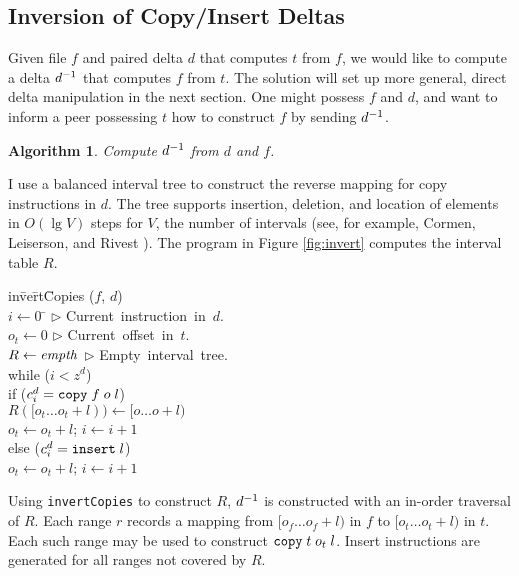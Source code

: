\documentclass{llncs}
\newtheorem{alg}{{\sc Algorithm}}
\begin{document}
\subsection{Inversion of Copy/Insert Deltas} \label{sec:invert}

Given file $f$ and paired delta $d$ that computes $t$ from $f$, we
would like to compute a delta $d^{-1}$ that computes $f$ from $t$.
The solution will set up more general, direct delta manipulation in
the next section.  One might possess $f$ and $d$, and want to inform a
peer possessing $t$ how to construct $f$ by sending $d^{-1}$.

\begin{alg}\label{alg:invert}
Compute $d^{-1}$ from $d$ and $f$.
\end{alg}

I use a balanced interval tree to construct the reverse mapping for
copy instructions in $d$.  The tree supports insertion, deletion, and
location of elements in $O(\lg V)$ steps for $V$, the number of
intervals (see, for example, Cormen, Leiserson, and Rivest
\cite{clr}).  The program in Figure \ref{fig:invert} computes the
interval table $R$.

\begin{figure*}
\begin{program}
in\= ve\= rt\= Copies ($f$, $d$) \\
  \> $i \leftarrow 0$ \>\> \hspace{6cm} \= $\triangleright$ \hbox{Current instruction in $d$.} \\
  \> $o_t \leftarrow 0$ \>\>\>             $\triangleright$ \hbox{Current offset in $t$.} \\
  \> $R \leftarrow \textrm{\emph{empth}}$ \>\>\> $\triangleright$ \hbox{Empty interval tree.} \\
  \> while ($i < z^d$) \\
  \>\> if ($c_i^d = \texttt{copy} \; f \; o \; l$) \\
  \>\>\> $R([o_t \ldots o_t + l)) \leftarrow [o \ldots o + l)$ \\
  \>\>\> $o_t \leftarrow o_t + l$; $i \leftarrow i + 1$ \\
  \>\> else ($c_i^d = \texttt{insert} \; l$) \\
  \>\>\> $o_t \leftarrow o_t + l$; $i \leftarrow i + 1$ \\
\end{program}
\caption{Invert Copies in $d$ from $f$}\label{fig:invert}
\end{figure*}

Using \texttt{invertCopies} to construct $R$, $d^{-1}$ is constructed
with an in-order traversal of $R$.  Each range $r$ records a mapping
from $[o_f \ldots o_f + l)$ in $f$ to $[o_t \ldots o_t + l)$ in $t$.
Each such range may be used to construct $\texttt{copy} \; t \; o_t \; l$.  Insert
instructions are generated for all ranges not covered by $R$.
\end{document}
